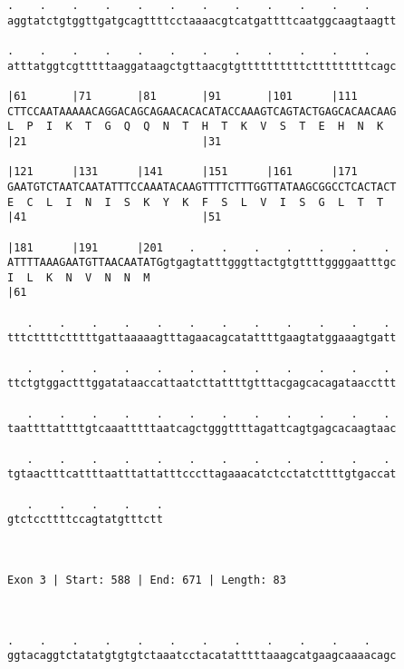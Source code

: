 \documentclass{article}
\begin{document}
\begin{Verbatim}
.    .    .    .    .    .    .    .    .    .    .    .    
aggtatctgtggttgatgcagttttcctaaaacgtcatgattttcaatggcaagtaagtt
                                                            
.    .    .    .    .    .    .    .    .    .    .    .    
atttatggtcgtttttaaggataagctgttaacgtgttttttttttctttttttttcagc
                                                            
|61       |71       |81       |91       |101      |111      
CTTCCAATAAAAACAGGACAGCAGAACACACATACCAAAGTCAGTACTGAGCACAACAAG
L  P  I  K  T  G  Q  Q  N  T  H  T  K  V  S  T  E  H  N  K  
|21                           |31                           
  
|121      |131      |141      |151      |161      |171      
GAATGTCTAATCAATATTTCCAAATACAAGTTTTCTTTGGTTATAAGCGGCCTCACTACT
E  C  L  I  N  I  S  K  Y  K  F  S  L  V  I  S  G  L  T  T  
|41                           |51                           
  
|181      |191      |201    .    .    .    .    .    .    . 
ATTTTAAAGAATGTTAACAATATGgtgagtatttgggttactgtgttttggggaatttgc
I  L  K  N  V  N  N  M                                      
|61                                                         
  
   .    .    .    .    .    .    .    .    .    .    .    . 
tttcttttctttttgattaaaaagtttagaacagcatattttgaagtatggaaagtgatt
                                                            
   .    .    .    .    .    .    .    .    .    .    .    . 
ttctgtggactttggatataaccattaatcttattttgtttacgagcacagataaccttt
                                                            
   .    .    .    .    .    .    .    .    .    .    .    . 
taattttattttgtcaaatttttaatcagctgggttttagattcagtgagcacaagtaac
                                                            
   .    .    .    .    .    .    .    .    .    .    .    . 
tgtaactttcattttaatttattatttcccttagaaacatctcctatcttttgtgaccat
                                                            
   .    .    .    .    .
gtctccttttccagtatgtttctt
                        
                        
 
Exon 3 | Start: 588 | End: 671 | Length: 83



.    .    .    .    .    .    .    .    .    .    .    .    
ggtacaggtctatatgtgtgtctaaatcctacatatttttaaagcatgaagcaaaacagc
                                                            

\end{Verbatim}
\end{document}
